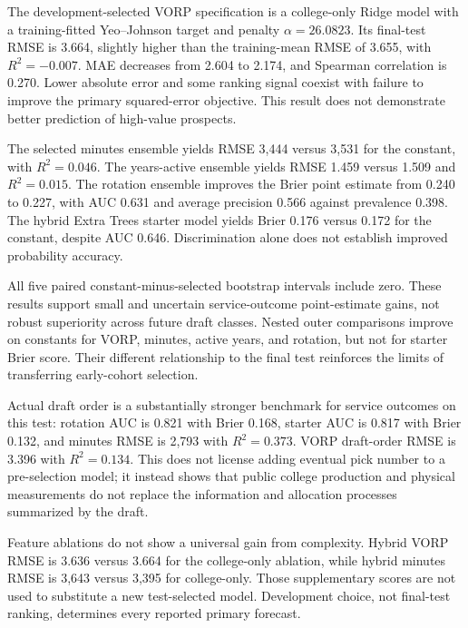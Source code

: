 The development-selected VORP specification is a college-only Ridge model with a training-fitted Yeo--Johnson target and penalty $\alpha=26.0823$. Its final-test RMSE is 3.664, slightly higher than the training-mean RMSE of 3.655, with $R^2=-0.007$. MAE decreases from 2.604 to 2.174, and Spearman correlation is 0.270. Lower absolute error and some ranking signal coexist with failure to improve the primary squared-error objective. This result does not demonstrate better prediction of high-value prospects.

The selected minutes ensemble yields RMSE 3,444 versus 3,531 for the constant, with $R^2=0.046$. The years-active ensemble yields RMSE 1.459 versus 1.509 and $R^2=0.015$. The rotation ensemble improves the Brier point estimate from 0.240 to 0.227, with AUC 0.631 and average precision 0.566 against prevalence 0.398. The hybrid Extra Trees starter model yields Brier 0.176 versus 0.172 for the constant, despite AUC 0.646. Discrimination alone does not establish improved probability accuracy.

All five paired constant-minus-selected bootstrap intervals include zero. These results support small and uncertain service-outcome point-estimate gains, not robust superiority across future draft classes. Nested outer comparisons improve on constants for VORP, minutes, active years, and rotation, but not for starter Brier score. Their different relationship to the final test reinforces the limits of transferring early-cohort selection.

Actual draft order is a substantially stronger benchmark for service outcomes on this test: rotation AUC is 0.821 with Brier 0.168, starter AUC is 0.817 with Brier 0.132, and minutes RMSE is 2,793 with $R^2=0.373$. VORP draft-order RMSE is 3.396 with $R^2=0.134$. This does not license adding eventual pick number to a pre-selection model; it instead shows that public college production and physical measurements do not replace the information and allocation processes summarized by the draft.

Feature ablations do not show a universal gain from complexity. Hybrid VORP RMSE is 3.636 versus 3.664 for the college-only ablation, while hybrid minutes RMSE is 3,643 versus 3,395 for college-only. Those supplementary scores are not used to substitute a new test-selected model. Development choice, not final-test ranking, determines every reported primary forecast.

